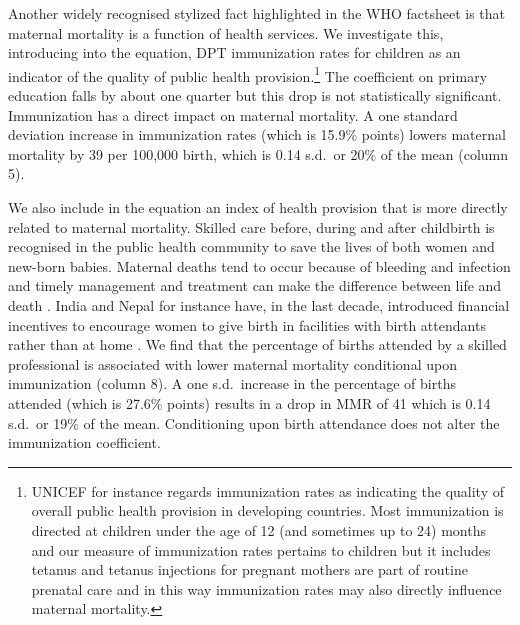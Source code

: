 \documentclass{article}[12pt,subeqn]
\begin{document}
\begin{spacing}{1.4}
Another widely recognised stylized fact highlighted in the WHO factsheet is that maternal mortality is a
function of health services. We investigate this, introducing into the equation, DPT immunization rates
for children as an indicator of the quality of public health provision.\footnote{UNICEF for instance regards 
immunization rates as indicating the quality of overall public health provision in developing countries. Most 
immunization is directed at children under the age of 12 (and sometimes up to 24) months and our measure of 
immunization rates pertains to children but it includes tetanus and tetanus injections for pregnant mothers 
are part of routine prenatal care and in this way immunization rates may also directly influence maternal 
mortality.} The coefficient on primary education falls by about one quarter but this drop is not statistically 
significant. Immunization has a direct impact on maternal mortality. A one standard deviation increase in 
immunization rates (which is 15.9\% points) lowers maternal mortality by 39 per 100,000 birth, which is 0.14 
s.d.\ or 20\% of the mean (column 5).

We also include in the equation an index of health provision that is more directly related to maternal
mortality. Skilled care before, during and after childbirth is recognised in the public health community to
save the lives of both women and new-born babies. Maternal deaths tend to occur because of bleeding and
infection and timely management and treatment can make the difference between life and death \citep{WHO2012}. 
India and Nepal for instance have, in the last decade, introduced financial incentives to encourage
women to give birth in facilities with birth attendants rather than at home \citep{Milleretal2012,
PowellJacksonHanson2012}. We find that the percentage of births attended by a skilled professional
is associated with lower maternal mortality conditional upon immunization (column 8). A one s.d.\ increase
in the percentage of births attended (which is 27.6\% points) results in a drop in MMR of 41 which is 0.14
s.d.\ or 19\% of the mean. Conditioning upon birth attendance does not alter the immunization coefficient.


\end{spacing}
\end{document}
